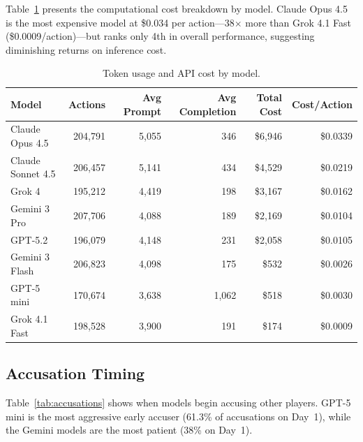 Table~\ref{tab:tokens} presents the computational cost breakdown by model. Claude Opus 4.5 is the most expensive model at \$0.034 per action---38$\times$ more than Grok 4.1 Fast (\$0.0009/action)---but ranks only 4th in overall performance, suggesting diminishing returns on inference cost.

\begin{table}[ht]
\caption{Token usage and API cost by model.}
\label{tab:tokens}
\centering
\small
\begin{tabular}{lrrrrr}
\toprule
\textbf{Model} & \textbf{Actions} & \textbf{Avg Prompt} & \textbf{Avg Completion} & \textbf{Total Cost} & \textbf{Cost/Action} \\
\midrule
Claude Opus 4.5         & 204,791 & 5,055 &   346 & \$6,946 & \$0.0339 \\
Claude Sonnet 4.5       & 206,457 & 5,141 &   434 & \$4,529 & \$0.0219 \\
Grok 4                  & 195,212 & 4,419 &   198 & \$3,167 & \$0.0162 \\
Gemini 3 Pro            & 207,706 & 4,088 &   189 & \$2,169 & \$0.0104 \\
GPT-5.2                 & 196,079 & 4,148 &   231 & \$2,058 & \$0.0105 \\
Gemini 3 Flash          & 206,823 & 4,098 &   175 &   \$532 & \$0.0026 \\
GPT-5 mini              & 170,674 & 3,638 & 1,062 &   \$518 & \$0.0030 \\
Grok 4.1 Fast           & 198,528 & 3,900 &   191 &   \$174 & \$0.0009 \\
\bottomrule
\end{tabular}
\end{table}


\subsection{Accusation Timing}
\label{app:accusations}

Table~\ref{tab:accusations} shows when models begin accusing other players. GPT-5 mini is the most aggressive early accuser (61.3\% of accusations on Day~1), while the Gemini models are the most patient (38\% on Day~1).

